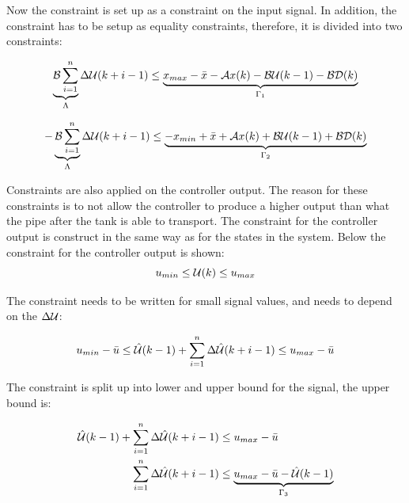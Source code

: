  Now the constraint is set up as a constraint on the input signal. In addition, the constraint has to be setup as equality constraints, therefore, it is divided into two constraints: 

 \begin{equation}
         \underbrace{\CMcal{B}\sum_{i=1}^n}_{\Lambda} \Delta\CMcal{U}(k+i-1)\leq \underbrace{x_{max}- \bar{x}-\CMcal{A}x(k)-\CMcal{B}\CMcal{U}(k-1)-\CMcal{B}\CMcal{D}(k)}_{\Gamma_1}
 \end{equation}  

 \begin{equation}
    -\underbrace{\CMcal{B}\sum_{i=1}^n}_{\Lambda} \Delta\CMcal{U}(k+i-1) \leq \underbrace{-x_{min}+\bar{x}+\CMcal{A}x(k)+\CMcal{B}\CMcal{U}(k-1)+\CMcal{B}\CMcal{D}(k)}_{\Gamma_2}
 \end{equation}


Constraints are also applied on the controller output. The reason for these constraints is to not allow the controller to produce a higher output than what the pipe after the tank is able to transport. The constraint for the controller output is construct in the same way as for the states in the system. Below the constraint for the controller output is shown:  
 \begin{equation}
 	u_{min} \leq \CMcal{U}(k) \leq u_{max}
 \end{equation}

The constraint needs to be written for small signal values, and needs to depend on the $\Delta \CMcal{U}$:

 \begin{equation}
 		u_{min} -  \bar{u} \leq \hat{\CMcal{U}}(k-1)+\sum_{i=1}^n \Delta\hat{\CMcal{U}}(k+i-1)  \leq  u_{max} -  \bar{u}
 \end{equation}

The constraint is split up into lower and upper bound for the signal, the upper bound is:

 \begin{equation}
 \begin{aligned}
			 	\hat{\CMcal{U}}(k-1)+\sum_{i=1}^n \Delta\hat{\CMcal{U}}(k+i-1)  &\leq  u_{max} -  \bar{u} \\
				\sum_{i=1}^n \Delta\hat{\CMcal{U}}(k+i-1)  &\leq  \underbrace{u_{max} -  \bar{u} - \hat{\CMcal{U}}(k-1)}_{\Gamma_3} \\
 \end{aligned}
 \end{equation}



